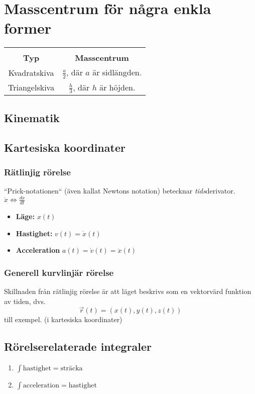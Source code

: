 \documentclass{article}
\newcommand{\midtitle}[1]{
\begin{center}
\Huge{\text{#1}}
\newpage
\end{center}
}
\begin{document}
\newpage
\appendix
\section{Masscentrum för några enkla former}
\large{
\begin{tabular}{|c|c|}
    \hline \\
     \textbf{Typ} &  \textbf{Masscentrum} \\
     \hline
     Kvadratskiva & $\frac a 2$, där $a$ är sidlängden. \\
     \hline
    Triangelskiva & $\frac h 3$, där $h$ är höjden. \\
    \hline
    
\end{tabular}
}
\newpage
\midtitle{Dynamik}
\newpage
\begin{paracol}{2}
\section{Kinematik}
\subsection{Kartesiska koordinater}
\subsubsection{Rätlinjig rörelse}
``Prick-notationen`` (även kallat Newtons notation) betecknar \textit{tids}derivator. $\dot x \iff \frac{dx}{dt}$
\begin{itemize}
    \item \textbf{Läge:} $x(t)$
    \item \textbf{Hastighet:} $v(t)= \dot x(t)$
    \item \textbf{Acceleration} $a(t)=\dot v(t) = \ddot x(t)$
\end{itemize}
\subsubsection{Generell kurvlinjär rörelse}
Skillnaden från rätlinjig rörelse är att läget beskrivs som en vektorvärd funktion av tiden, dvs. $$\vec r(t)=(x(t),y(t),z(t))$$ till exempel. (i kartesiska koordinater)
\subsection{Rörelserelaterade integraler}
\begin{enumerate}
    \item $\int \text{hastighet} = \text{sträcka}$
    \item $\int \text{acceleration} = \text{hastighet}$
\end{enumerate}

\end{paracol}
\end{document}
